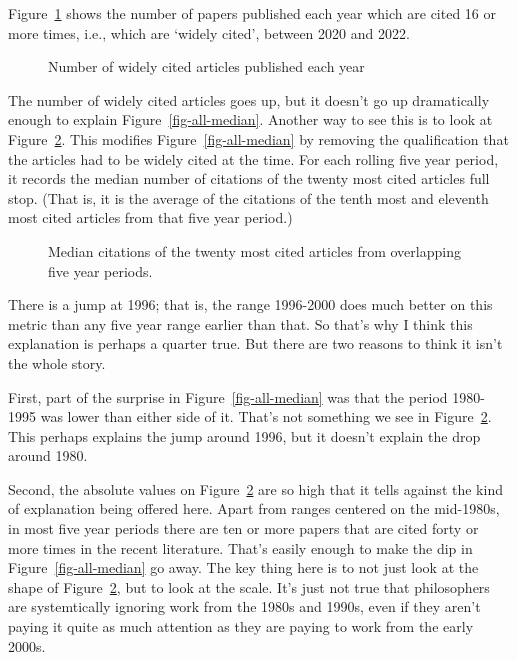\documentclass[
  10pt,
  letterpaper,
  DIV=11,
  numbers=noendperiod,
  twoside]{scrartcl}
\begin{document}
Figure~\ref{fig-all-widely-cited} shows the number of papers published
each year which are cited 16 or more times, i.e., which are `widely
cited', between 2020 and 2022.

\begin{figure}


\caption{\label{fig-all-widely-cited}Number of widely cited articles
published each year}

\end{figure}%

The number of widely cited articles goes up, but it doesn't go up
dramatically enough to explain Figure~\ref{fig-all-median}. Another way
to see this is to look at Figure~\ref{fig-all-median-unqualified}. This
modifies Figure~\ref{fig-all-median} by removing the qualification that
the articles had to be widely cited at the time. For each rolling five
year period, it records the median number of citations of the twenty
most cited articles full stop. (That is, it is the average of the
citations of the tenth most and eleventh most cited articles from that
five year period.)

\begin{figure}


\caption{\label{fig-all-median-unqualified}Median citations of the
twenty most cited articles from overlapping five year periods.}

\end{figure}%

There is a jump at 1996; that is, the range 1996-2000 does much better
on this metric than any five year range earlier than that. So that's why
I think this explanation is perhaps a quarter true. But there are two
reasons to think it isn't the whole story.

First, part of the surprise in Figure~\ref{fig-all-median} was that the
period 1980-1995 was lower than either side of it. That's not something
we see in Figure~\ref{fig-all-median-unqualified}. This perhaps explains
the jump around 1996, but it doesn't explain the drop around 1980.

Second, the absolute values on Figure~\ref{fig-all-median-unqualified}
are so high that it tells against the kind of explanation being offered
here. Apart from ranges centered on the mid-1980s, in most five year
periods there are ten or more papers that are cited forty or more times
in the recent literature. That's easily enough to make the dip in
Figure~\ref{fig-all-median} go away. The key thing here is to not just
look at the shape of Figure~\ref{fig-all-median-unqualified}, but to
look at the scale. It's just not true that philosophers are
systemtically ignoring work from the 1980s and 1990s, even if they
aren't paying it quite as much attention as they are paying to work from
the early 2000s.
\end{document}
